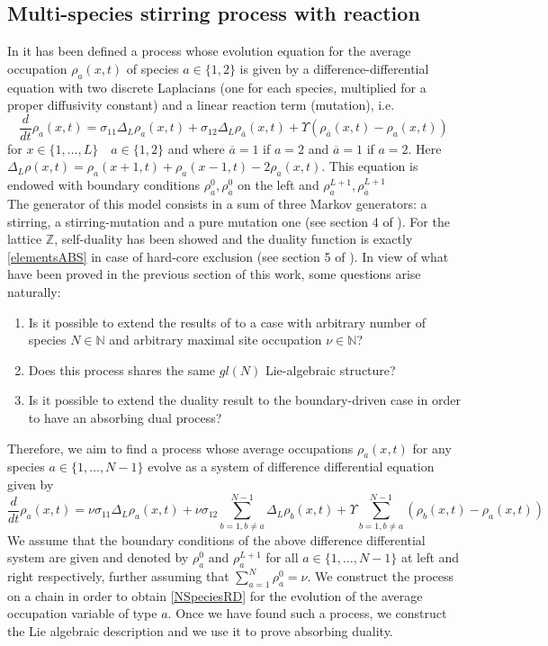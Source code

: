 \documentclass[10pt]{article}
\numberwithin{equation}{section}
\numberwithin{equation}{subsection}
\begin{document}
\subsection{Multi-species stirring process with reaction} \label{Subsection-RD}
In \cite{casini2022uphill} it has been defined a process whose evolution equation for the average occupation $\rho_{a}(x,t)$ of species $a\in \{1,2\}$ is given by a difference-differential equation with two discrete Laplacians (one for each species, multiplied for a proper diffusivity constant) and a linear reaction term (mutation), i.e.
\begin{equation}\label{2SpeciesRD}
	\frac{d}{dt} \rho_{a}(x,t)=\sigma_{11}\Delta_{L}\rho_{a}(x,t)+\sigma_{12}\Delta_{L}\rho_{\overline{a}}(x,t)+\Upsilon\left(\rho_{\overline{a}}(x,t)-\rho_{a}(x,t)\right)
\end{equation} 
for $ x\in\{1,\ldots,L\}\quad a\in\{1,2\}$  and where $\overline{a}=1$ if $a=2$ and $\overline{a}=1$ if $a=2$. Here $\Delta_{L}\rho(x,t)=\rho_{a}(x+1,t)+\rho_{a}(x-1,t)-2\rho_{a}(x,t)$.
This equation is endowed with boundary conditions $\rho_{a}^{0},\rho_{\overline{a}}^{0}$ on the left and $\rho_{a}^{L+1},\rho_{\overline{a}}^{L+1}$ \\The generator of this model consists in a sum of three Markov generators: a stirring, a stirring-mutation and a pure mutation one (see section 4 of \cite{casini2022uphill}). For the lattice $\mathbb{Z}$, self-duality has been showed and the duality function is exactly \eqref{elementsABS} in case of hard-core exclusion (see section 5 of \cite{casini2022uphill}). In view of what have been proved in the previous section of this work, some questions arise naturally:
\begin{enumerate}
		\item Is it possible to extend the results of \cite{casini2022uphill} to a case with arbitrary number of species $N\in \mathbb{N}$ and arbitrary maximal site occupation $\nu\in \mathbb{N}$?
			\item Does this process shares the same $gl(N)$ Lie-algebraic structure?
	\item Is it possible to extend the duality result to the boundary-driven case in order to have an absorbing dual process?
\end{enumerate}
Therefore, we aim to find a process whose average occupations $\rho_{a}(x,t)$ for any species $a\in\{1,\ldots,N-1\}$ evolve as a system of difference differential equation given by 
\begin{equation}\label{NSpeciesRD}
	\frac{d}{dt} \rho_{a}(x,t)=\nu\sigma_{11}\Delta_{L}\rho_{a}(x,t)+\nu\sigma_{12}\sum_{b=1,b\neq a}^{N-1}\Delta_{L}\rho_{b}(x,t)+\Upsilon\sum_{b=1,b\neq a}^{N-1}\left(\rho_{b}(x,t)-\rho_{a}(x,t)\right)
\end{equation} 
 We assume that the boundary conditions of the above difference differential system are given and denoted by $\rho_{a}^{0}$ and $\rho_{a}^{L+1}$ for all $a\in\{1,\ldots,N-1\}$ at left and right respectively, further assuming that $\sum_{a=1}^{N}\rho_{a}^{0}=\nu$.
 We construct the process on a chain in order to obtain \eqref{NSpeciesRD} for the evolution of the average occupation variable of type $a$. Once we have found such a process, we construct the Lie algebraic description and we use it to prove absorbing duality.
\end{document}
